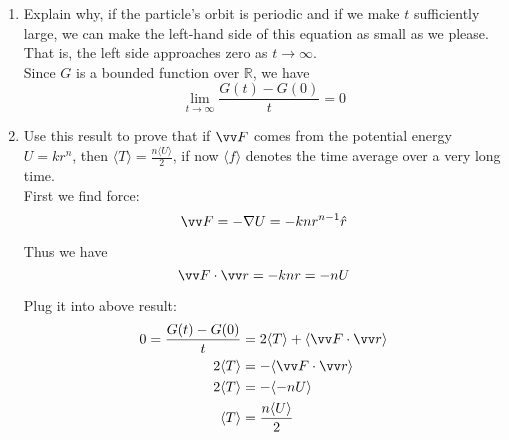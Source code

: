 \documentclass{article}
\begin{document}
\begin{enumerate}
\begin{enumerate}
            \item Explain why, if the particle's orbit is periodic and if we make $t$ sufficiently large, we can make the left-hand side of this equation as small as we please. That is, the left side approaches zero as $t \rightarrow \infty$.\\

            Since $G$ is a bounded function over $\mathbb{R}$, we have
            \[
            \lim_{t\rightarrow\infty} \frac{G(t) - G(0)}{t} = 0
            \]

            \item Use this result to prove that if $\vv F$ comes from the potential energy $U = kr^n$, then $\langle T \rangle = \frac{n \langle U \rangle}{2}$, if now $\langle f \rangle$ denotes the time average over a very long time. \\

            First we find force:
            \[
            \vv F = - \nabla U = -knr^{n-1} \hat r
            \]

            Thus we have
            \[
            \vv F \cdot \vv r = -knr = - n U
            \]

            Plug it into above result:
            \begin{align*}
                0 = \frac{G(t) - G(0)}{t} &= 2\langle T \rangle + \langle \vv F \cdot \vv r \rangle \\
                2\langle T \rangle &= - \langle \vv F \cdot \vv r \rangle \\
                2\langle T \rangle &= - \langle -nU \rangle \\
                \langle T \rangle &= \frac{n \langle U \rangle}{2}
            \end{align*}


        \end{enumerate}
\end{enumerate}
\end{document}
